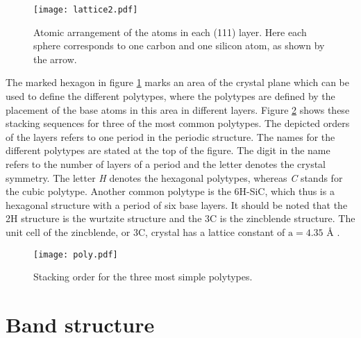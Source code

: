 \begin{figure}[h]
\begin{center}
\texttt{[image: lattice2.pdf]}
\caption{Atomic arrangement of the atoms in each (111) layer. Here each sphere corresponds to one carbon and one silicon atom, as shown by the arrow. 
\label{fig:hex}}
\end{center}
\end{figure}

The marked hexagon in figure \ref{fig:hex} marks an area of the crystal plane which can be used to define the different polytypes, where the polytypes are defined by the placement of the base atoms in this area in different layers. Figure \ref{fig:poly} shows these stacking sequences for three of the most common polytypes. The depicted orders of the layers refers to one period in the periodic structure. The names for the different polytypes are stated at the top of the figure. The digit in the name refers to the number of layers of a period and the letter denotes the crystal symmetry. The letter \emph{H} denotes the hexagonal polytypes, whereas \emph{C} stands for the cubic polytype. Another common polytype is the 6H-SiC, which thus is a hexagonal structure with a period of six base layers. It should be noted that the 2H structure is the wurtzite structure and the 3C is the zincblende structure. The unit cell of the zincblende, or 3C, crystal has a lattice constant of $\mathrm{a} = 4.35$ Å \cite{Bimberg1981}. 




\begin{figure}[h]
\begin{center}
\texttt{[image: poly.pdf]}
\caption{Stacking order for the three most simple polytypes. 
\label{fig:poly}}
\end{center}
\end{figure}

\section{Band structure}
\label{sec:band_structure}

